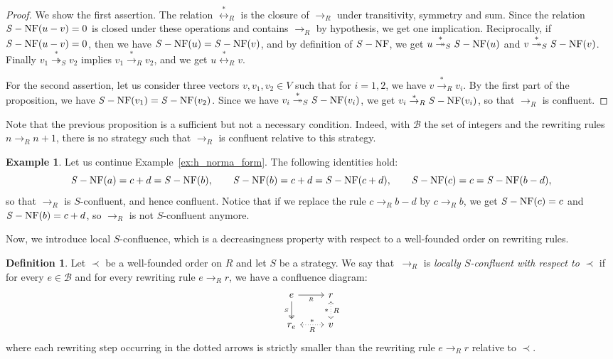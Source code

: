 \documentclass[10pt]{easychair}
\theoremstyle{definition}
\newtheorem{definition}[theorem]{Definition}
\newtheorem{example}[theorem]{Example}
\newcommand\basis{\mathscr{B}}
\newcommand\rewR{\to_R}
\newcommand\transR{\overset{*}{\to}_R}
\newcommand\transS{\overset{*}{\twoheadrightarrow}_S}
\newcommand\equivR{\overset{*}{\leftrightarrow}_R}
\DeclareMathOperator{\SNF}{{\it S}-NF}
\begin{document}
\begin{proof}
  We show the first assertion. The relation $\equivR$ is the closure of
  $\rewR$ under transitivity, symmetry and sum. Since the relation
  $\SNF(u-v)=0$ is closed under these operations and contains $\rewR$ by
  hypothesis, we get one implication. Reciprocally, if $\SNF(u-v)=0$,
  then we have $\SNF(u)=\SNF(v)$, and by definition of $\SNF$, we get
  $u\transS\SNF(u)$ and $v\transS\SNF(v)$. Finally $v_1\transS v_2$
  implies $v_1\transR v_2$, and we get $u\equivR v$.

  For the second assertion, let us consider three vectors
  $v,v_1,v_2\in V$ such that for $i=1,2$, we have $v\transR v_i$. By the
  first part of the proposition, we have $\SNF(v_1)=\SNF(v_2)$. Since we
  have $v_i\transS\SNF(v_i)$, we get $v_i\transR\SNF(v_i)$, so that
  $\rewR$ is confluent.
\end{proof}
\smallskip

Note that the previous proposition is a sufficient but not a necessary
condition. Indeed, with $\basis$ the set of integers and the rewriting
rules $n\rewR n+1$, there is no strategy such that $\rewR$ is confluent
relative to this strategy.
\smallskip

\begin{example}
  Let us continue Example~\ref{ex:h_norma_form}. The following identities
  hold:
  \[\SNF(a)=c+d=\SNF(b),\qquad\SNF(b)=c+d=\SNF(c+d),\qquad
  \SNF(c)=c=\SNF(b-d),
  \]
  so that $\rewR$ is $S$-confluent, and hence confluent. Notice that if
  we replace the rule $c\rewR b-d$ by $c\rewR b$, we get $\SNF(c)=c$ and
  $\SNF(b)=c+d$, so $\rewR$ is not $S$-confluent anymore. 
\end{example}
\smallskip

Now, we introduce local $S$-confluence, which is a decreasingness
property with respect to a well-founded order on rewriting rules.
\smallskip

\begin{definition}\label{def:decreasingness_property}
  Let $\prec$ be a well-founded order on $R$ and let $S$ be a strategy.
  We say that~$\rewR$ is \emph{locally $S$-confluent with respect to}
  $\prec$ if for every $e\in\basis$ and for every rewriting rule
  $e\rewR r$, we have a confluence diagram:
  \[\begin{tikzcd}
  e\ar[r, "_R"']\ar[d, twoheadrightarrow, "_S"'] & r\ar[d, leftrightarrow, dotted, "*"', "R"]\\
  r_e\ar[r, leftrightarrow, dotted, "*", "R"'] & v
  \end{tikzcd}\]
  where each rewriting step occurring in the dotted arrows is strictly smaller
  than the rewriting rule $e\rewR r$ relative to $\prec$.
\end{definition}
\smallskip
\end{document}
